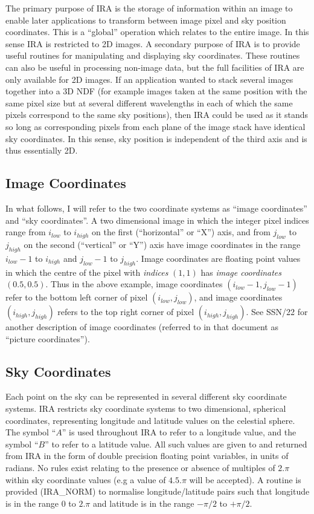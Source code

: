 The primary purpose of IRA is the storage of information within an image to
enable later applications to transform between image pixel and sky position
coordinates. This is a ``global'' operation which relates to the entire image.
In this sense IRA is restricted to 2D images. A secondary purpose of IRA is to
provide useful routines for manipulating and displaying sky coordinates. These
routines can also be useful in processing non-image data, but the full
facilities of IRA are only available for 2D images. If an application wanted to
stack several images together into a 3D NDF (for example images taken at the
same position with the same pixel size but at several different wavelengths in
each of which the same pixels correspond to the same sky positions), then IRA
could be used as it stands so long as corresponding pixels from each plane of
the image stack have identical sky coordinates. In this sense, sky position is
independent of the third axis and is thus essentially 2D.

\subsection {Image Coordinates}
In what follows, I will refer to the two coordinate systems as ``image
coordinates'' and ``sky coordinates''.
A two dimensional image in which the
integer pixel indices range from $i_{low}$ to $i_{high}$ on the first
(``horizontal'' or ``X'') axis, and from $j_{low}$ to $j_{high}$ on the second
(``vertical'' or ``Y'') axis have image coordinates in the range $i_{low}-1$ to
$i_{high}$ and $j_{low}-1$ to $j_{high}$. Image coordinates are floating point
values in which the centre of the pixel with {\em indices }
$(1,1)$ has {\em image coordinates} $(0.5,0.5)$. Thus in the above example, image
coordinates $(i_{low}-1,j_{low}-1)$ refer to the bottom left corner of pixel
$(i_{low},j_{low})$, and image coordinates $(i_{high},j_{high})$ refers to the
top right corner of pixel $(i_{high},j_{high})$. See SSN/22 for another
description of image coordinates (referred to in that document as ``picture
coordinates'').

\subsection {Sky Coordinates}
\label {SEC:SCS}
Each point on the sky can be represented in several different sky coordinate
systems. IRA restricts sky coordinate systems to two dimensional, spherical
coordinates, representing longitude and latitude values on the celestial sphere.
The symbol ``$A$'' is used throughout IRA to refer to a longitude value, and the
symbol ``$B$'' to refer to a latitude value. All such values are given to and
returned from IRA in the form of double precision floating point variables, in
units of radians. No rules exist relating to the presence or absence of
multiples of $2.\pi$ within sky coordinate values (e.g a value of $4.5.\pi$ will
be accepted). A routine is provided (IRA\_NORM) to normalise longitude/latitude
pairs such that longitude is in the range $0$ to $2.\pi$ and latitude is in the
range $-\pi/2$ to $+\pi/2$.

